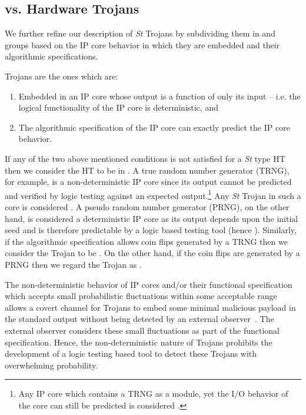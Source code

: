 \documentclass[10pt,journal,compsoc]{IEEEtran}
\begin{document}
\subsection{ vs.  Hardware Trojans} 
We further refine our description of \textit{St} Trojans by subdividing them in  and  groups based on the IP core behavior in which they are embedded and their algorithmic specifications.

\begin{definition}
\boldmath{} Trojans are the ones which are:
\begin{enumerate} 
\item Embedded in an IP core whose output is a function of only its input -- i.e. the logical functionality of the IP core is deterministic, and 
\item The algorithmic specification of the IP core can exactly predict the IP core behavior.
\end{enumerate}
\end{definition}

If any of the two above mentioned conditions is not satisfied for a \textit{St} type HT then we consider the HT to be in .
A true random number generator (TRNG), for example, is a non-deterministic IP core since its output cannot be predicted and verified by logic testing against an expected output.\footnote{Any IP core which contains a TRNG as a module, yet the I/O behavior of the core can still be predicted is considered .}
Any \textit{St} Trojan in such a core is considered .
A pseudo random number generator (PRNG), on the other hand, is considered a deterministic IP core as its output depends upon the initial seed and is therefore predictable by a logic based testing tool (hence ).
Similarly, if the algorithmic specification allows coin flips generated by a TRNG then we consider the Trojan to be .
On the other hand, if the coin flips are generated by a PRNG then we regard the Trojan as .

The non-deterministic behavior of IP cores and/or their functional specification which accepts small probabilistic fluctuations within some acceptable range allows a covert channel for  Trojans to embed some minimal malicious payload in the standard output without being detected by an external observer~\cite{bellare2014security}.
The external observer considers these small fluctuations as part of the functional specification.
Hence, the non-deterministic nature of  Trojans prohibits the development of a logic testing based tool to detect these Trojans with overwhelming probability.
\end{document}
